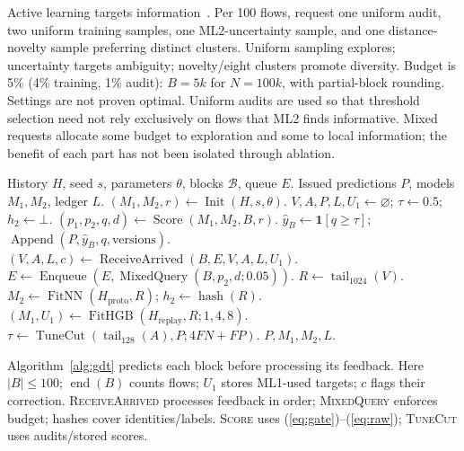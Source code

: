 \documentclass[conference]{IEEEtran}
\newcommand{\ind}{\mathbf{1}}
\begin{document}
Active learning targets information~\cite{settles}. Per 100 flows, request one uniform audit, two uniform training samples, one ML2-uncertainty sample, and one distance-novelty sample preferring distinct clusters. Uniform sampling explores; uncertainty targets ambiguity; novelty/eight clusters promote diversity. Budget is 5\% (4\% training, 1\% audit): $B=5k$ for $N=100k$, with partial-block rounding. Settings are not proven optimal. Uniform audits are used so that threshold selection need not rely exclusively on flows that ML2 finds informative. Mixed requests allocate some budget to exploration and some to local information; the benefit of each part has not been isolated through ablation.

\begin{algorithm}[t]
\caption{GDT with delayed and revised feedback}
\label{alg:gdt}
\footnotesize
\begin{algorithmic}[1]
\REQUIRE History $H$, seed $s$, parameters $\theta$, blocks $\mathcal B$, queue $E$.
\ENSURE Issued predictions $P$, models $M_1,M_2$, ledger $L$.
\STATE $(M_1,M_2,r)\gets\operatorname{Init}(H,s,\theta)$.
\STATE $V,A,P,L,U_1\gets\varnothing$; $\tau\gets0.5$; $h_2\gets\bot$.
\STATE $(p_1,p_2,q,d)\gets\operatorname{Score}(M_1,M_2,B,r)$.
\STATE $\hat y_B\gets\ind[q\ge\tau]$; $\operatorname{Append}(P,\hat y_B,q,\mathrm{versions})$.
\STATE $(V,A,L,c)\gets\operatorname{ReceiveArrived}(B,E,V,A,L,U_1)$.
\STATE $E\gets\operatorname{Enqueue}(E,\operatorname{MixedQuery}(B,p_2,d;0.05))$.
\STATE $R\gets\operatorname{tail}_{1024}(V)$.
\STATE $M_2\gets\operatorname{FitNN}(H_{\mathrm{proto}},R)$; $h_2\gets\operatorname{hash}(R)$.
\ENDIF
{}
\STATE $(M_1,U_1)\gets\operatorname{FitHGB}(H_{\mathrm{replay}},R;1,4,8)$.
\ENDIF
{}
\STATE $\tau\gets\operatorname{TuneCut}(\operatorname{tail}_{128}(A),P;4FN+FP)$.
\ENDIF
\ENDFOR
\RETURN $P,M_1,M_2,L$.
\end{algorithmic}
\end{algorithm}
Algorithm~\ref{alg:gdt} predicts each block before processing its feedback. Here $|B|\le100$; $\operatorname{end}(B)$ counts flows; $U_1$ stores ML1-used targets; $c$ flags their correction. \textsc{ReceiveArrived} processes feedback in order; \textsc{MixedQuery} enforces budget; hashes cover identities/labels. \textsc{Score} uses (\ref{eq:gate})--(\ref{eq:raw}); \textsc{TuneCut} uses audits/stored scores.
\end{document}
